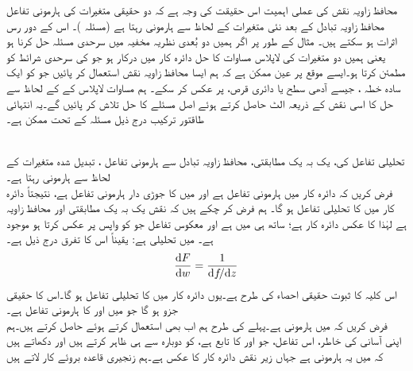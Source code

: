 محافظ زاویہ نقش کی عملی اہمیت اس حقیقت کی   وجہ ہے کہ دو حقیقی متغیرات کی ہارمونی تفاعل محافظ زاویہ تبادل کے بعد نئی متغیرات کے لحاظ سے ہارمونی رہتا ہے (مسئلہ )۔ اس کے دور رس اثرات  ہو سکتے ہیں۔ مثال کے طور پر اگر ہمیں دو بُعدی نظریہ مخفیہ میں سرحدی مسئلہ حل کرنا ہو یعنی ہمیں دو متغیرات کی لاپلاس مساوات کا حل دائرہ کار  میں درکار ہو جو  کی سرحدی شرائط کو مطمئن کرتا ہو۔ایسے موقع پر عین ممکن ہے کہ ہم ایسا محافظ زاویہ نقش استعمال کر پائیں جو  کو ایک سادہ خطہ ، جیسے آدھی سطح یا دائری قرص، پر عکس کر سکے۔ ہم مساوات لاپلاس کے  کے لحاظ سے حل کا اسی نقش کے ذریعہ الٹ حاصل کرتے ہوئے اصل مسئلے کا حل تلاش کر پائیں گے۔یہ انتہائی طاقتور ترکیب درج ذیل مسئلہ کے تحت ممکن ہے۔

\quad {}\\
تحلیلی تفاعل  کی، یک بہ یک مطابقتی، محافظ زاویہ تبادل  سے  ہارمونی تفاعل ،  تبدیل شدہ متغیرات کے لحاظ سے ہارمونی رہتا ہے۔ 
\quad {}\\
فرض کریں کہ دائرہ کار  میں ہارمونی تفاعل  ہے  اور  میں  کا جوڑی دار ہارمونی تفاعل  ہے، نتیجتاً  دائرہ کار  میں  کا تحلیلی تفاعل  ہو گا۔ ہم فرض کر چکے ہیں کہ نقش  یک بہ یک مطابقتی اور محافظ زاویہ ہے لہٰذا  کا عکس  دائرہ کار ہے؛ ساتھ ہی  میں  ہے اور معکوس تفاعل  جو  کو واپس  پر عکس کرتا ہو موجود ہے۔ میں  تحلیلی ہے: یقیناً اس کا  تفرق درج ذیل ہے۔
\begin{align*}
\frac{\dif F}{\dif w}=\frac{1}{\dif f\!/\!\dif z}
\end{align*}
اس کلیہ کا ثبوت حقیقی احصاء کی طرح ہے۔یوں  دائرہ کار  میں  کا تحلیلی تفاعل ہو گا۔اس کا حقیقی جزو  ہو گا جو  میں  اور  کا ہارمونی تفاعل ہے۔ 
\quad {}\\
فرض کریں کہ  میں  ہارمونی ہے۔پہلے کی طرح ہم اب بھی  استعمال کرتے  ہوئے  حاصل کرتے ہیں۔ہم اپنی  آسانی کی خاطر، اس تفاعل، جو  اور  کا تابع ہے، کو دوبارہ  سے ہی ظاہر کرتے ہیں اور دکھاتے ہیں کہ  میں یہ ہارمونی ہے جہاں   زیر نقش  دائرہ کار  کا عکس ہے۔ہم زنجیری قاعدہ بروئے کار لاتے ہیں

